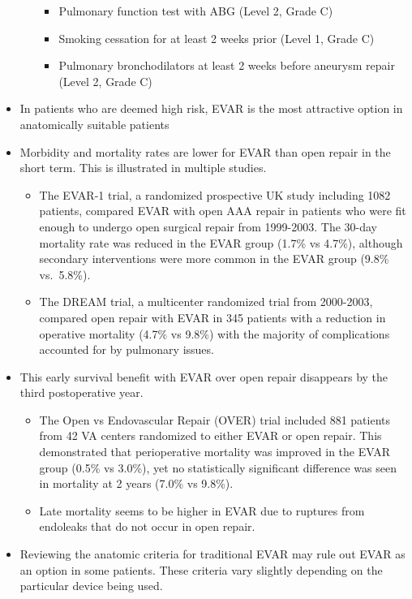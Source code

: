 \documentclass[
]{book}
\begin{document}
\begin{itemize}
\begin{itemize}
    \begin{itemize}
    \item
      Pulmonary function test with ABG (Level 2, Grade C)
    \item
      Smoking cessation for at least 2 weeks prior (Level 1,
      Grade C)
    \item
      Pulmonary bronchodilators at least 2 weeks before aneurysm
      repair (Level 2, Grade C)
    \end{itemize}
  \end{itemize}
\item
  In patients who are deemed high risk, EVAR is the most attractive
  option in anatomically suitable patients
\item
  Morbidity and mortality rates are lower for EVAR than open repair in
  the short term. This is illustrated in multiple studies.

  \begin{itemize}
  \item
    The EVAR-1 trial, a randomized prospective UK study including
    1082 patients, compared EVAR with open AAA repair in patients
    who were fit enough to undergo open surgical repair from
    1999-2003. The 30-day mortality rate was reduced in the EVAR
    group (1.7\% vs 4.7\%), although secondary interventions were more
    common in the EVAR group (9.8\% vs.~5.8\%).
    \citep{greenhalghComparisonEndovascularAneurysm2004}
  \item
    The DREAM trial, a multicenter randomized trial from 2000-2003,
    compared open repair with EVAR in 345 patients with a reduction
    in operative mortality (4.7\% vs 9.8\%) with the majority of
    complications accounted for by pulmonary issues.
    \citep{prinssenRandomizedTrialComparing2004}
  \end{itemize}
\item
  This early survival benefit with EVAR over open repair disappears by
  the third postoperative year.

  \begin{itemize}
  \item
    The Open vs Endovascular Repair (OVER) trial included 881
    patients from 42 VA centers randomized to either EVAR or open
    repair. This demonstrated that perioperative mortality was
    improved in the EVAR group (0.5\% vs 3.0\%), yet no statistically
    significant difference was seen in mortality at 2 years (7.0\% vs
    9.8\%). \citep{lederleOpenEndovascularRepair2019}
  \item
    Late mortality seems to be higher in EVAR due to ruptures from
    endoleaks that do not occur in open repair.
    \citep{rajendranLateRuptureAbdominal2017}
  \end{itemize}
\item
  Reviewing the anatomic criteria for traditional EVAR may rule out
  EVAR as an option in some patients. These criteria vary slightly
  depending on the particular device being used.


\end{itemize}
\end{document}
